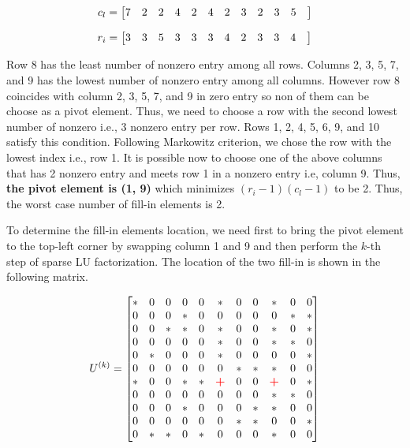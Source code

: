 \begin{enumerate}
$$
\setcounter{MaxMatrixCols}{50}
c_{l} = 
\begin{bmatrix}
 7&
 2&
 2&
 4&
 2&
 4&
 2&
 3&
 2&
 3&
 5&
\end{bmatrix}
$$

$$
\setcounter{MaxMatrixCols}{50}
r_{i} = 
\begin{bmatrix}
 3&
 3&
 5&
 3&
 3&
 3&
 4&
 2&
 3&
 3&
 4&
\end{bmatrix}
$$

Row 8 has the least number of nonzero entry among all rows. Columns 2, 3, 5, 7, and 9 has the lowest number of nonzero entry among all columns. However row 8 coincides with column 2, 3, 5, 7, and 9 in zero entry so non of them can be choose as a pivot element. Thus, we need to choose a row with the second lowest number of nonzero i.e., 3 nonzero entry per row. Rows 1, 2, 4, 5, 6, 9, and 10 satisfy  this condition. Following Markowitz criterion, we chose the row with the lowest index i.e., row 1. It is possible now to choose one of the above columns that has 2 nonzero entry and meets row 1 in a nonzero entry i.e, column 9. Thus, \textbf{the pivot element is (1, 9)} which minimizes $(r_{i} -1)(c_{l}-1)$ to be 2. Thus, the worst case number of fill-in elements is 2. 

To determine the fill-in elements location, we need first to bring the pivot element to the top-left corner by swapping column 1 and 9 and then perform the $k$-th step of sparse LU factorization. The location of the two fill-in is shown in the following matrix. 

$$
U^{(k)} = 
\setcounter{MaxMatrixCols}{11}
\begin{bmatrix}
* & 0 & 0 & 0 & 0 & * & 0 & 0 & * & 0 & 0 \\
0 & 0 & 0 & * & 0 & 0 & 0 & 0 & 0 & * & * \\
0 & 0 & * & * & 0 & * & 0 & 0 & * & 0 & * \\
0 & 0 & 0 & 0 & 0 & * & 0 & 0 & * & * & 0 \\
0 & * & 0 & 0 & 0 & * & 0 & 0 & 0 & 0 & * \\
0 & 0 & 0 & 0 & 0 & 0 & * & * & * & 0 & 0 \\
* & 0 & 0 & * & * & \color{red}{\textbf{+}} & 0 & 0 & \color{red}{\textbf{+}} & 0 & * \\
0 & 0 & 0 & 0 & 0 & 0 & 0 & 0 & * & * & 0 \\
0 & 0 & 0 & * & 0 & 0 & 0 & * & * & 0 & 0 \\
0 & 0 & 0 & 0 & 0 & 0 & * & * & 0 & 0 & * \\
0 & * & * & 0 & * & 0 & 0 & 0 & * & 0 & 0 \\
\end{bmatrix}
$$

\end{enumerate}


